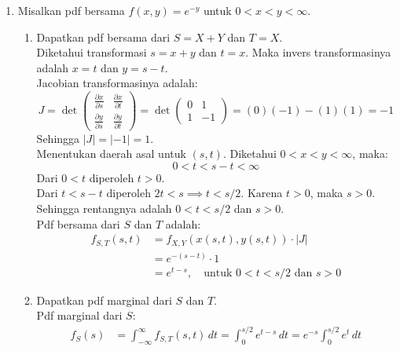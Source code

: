 \documentclass[11pt,letterpaper]{article}
\begin{document}
\begin{enumerate}
  \item Misalkan pdf bersama $f(x,y) = e^{-y}$ untuk $0 < x < y < \infty$.
        \begin{enumerate}[label=\alph*)]
          \item Dapatkan pdf bersama dari $S = X + Y$ dan $T = X$. \\
                Diketahui transformasi $s = x + y$ dan $t = x$.
                Maka invers transformasinya adalah $x = t$ dan $y = s - t$. \\
                Jacobian transformasinya adalah:
                \[ J = \det \begin{pmatrix} \frac{\partial x}{\partial s} & \frac{\partial x}{\partial t} \\ \frac{\partial y}{\partial s} & \frac{\partial y}{\partial t} \end{pmatrix} = \det \begin{pmatrix} 0 & 1 \\ 1 & -1 \end{pmatrix} = (0)(-1) - (1)(1) = -1 \]
                Sehingga $|J| = |-1| = 1$. \\
                Menentukan daerah asal untuk $(s,t)$. Diketahui $0 < x < y < \infty$, maka:
                \[ 0 < t < s - t < \infty \]
                Dari $0 < t$ diperoleh $t > 0$. \\
                Dari $t < s - t$ diperoleh $2t < s \implies t < s/2$. Karena $t > 0$, maka $s > 0$. \\
                Sehingga rentangnya adalah $0 < t < s/2$ dan $s > 0$. \\
                Pdf bersama dari $S$ dan $T$ adalah:
                \begin{align*}
                  f_{S,T}(s,t) & = f_{X,Y}(x(s,t), y(s,t)) \cdot |J|                           \\
                               & = e^{-(s-t)} \cdot 1                                          \\
                               & = e^{t-s}, \quad \text{untuk } 0 < t < s/2 \text{ dan } s > 0
                \end{align*}
          \item Dapatkan pdf marginal dari $S$ dan $T$. \\
                Pdf marginal dari $S$:
                \begin{align*}
                  f_S(s) & = \int_{-\infty}^{\infty} f_{S,T}(s,t) \,dt = \int_{0}^{s/2} e^{t-s} \,dt = e^{-s} \int_{0}^{s/2} e^t \,dt \\

\end{align*}
\end{enumerate}
\end{enumerate}
\end{document}

